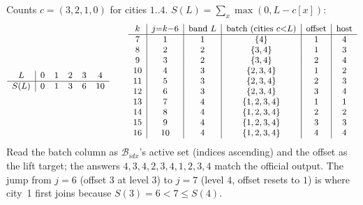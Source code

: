 \begin{tracebox}[Water-fill on \(n=6,m=4\), \(a=(3,1,1,1,2,2)\)]
Counts \(c=(3,2,1,0)\) for cities \(1..4\). \(S(L)=\sum_x\max(0,L-c[x])\):
\[
{\small
\begin{array}{c|ccccc}
L & 0 & 1 & 2 & 3 & 4\\ \hline
S(L) & 0 & 1 & 3 & 6 & 10
\end{array}}
\qquad
{\small
\begin{array}{c|c|c|c|c|c}
k & j{=}k{-}6 & \text{band }L & \text{batch }(\text{cities }c{<}L) & \text{offset} & \text{host}\\ \hline
7&1&1&\{4\}&1&4\\
8&2&2&\{3,4\}&1&3\\
9&3&2&\{3,4\}&2&4\\
10&4&3&\{2,3,4\}&1&2\\
11&5&3&\{2,3,4\}&2&3\\
12&6&3&\{2,3,4\}&3&4\\
13&7&4&\{1,2,3,4\}&1&1\\
14&8&4&\{1,2,3,4\}&2&2\\
15&9&4&\{1,2,3,4\}&3&3\\
16&10&4&\{1,2,3,4\}&4&4
\end{array}}
\]
Read the batch column as \(\mathcal{B}_{\mathit{idx}}\)'s active set (indices
ascending) and the offset as the lift target; the answers
\(4,3,4,2,3,4,1,2,3,4\) match the official output. The jump from \(j=6\) (offset
\(3\) at level \(3\)) to \(j=7\) (level \(4\), offset resets to \(1\)) is where
city~1 first joins because \(S(3)=6<7\le S(4)\).
\end{tracebox}

